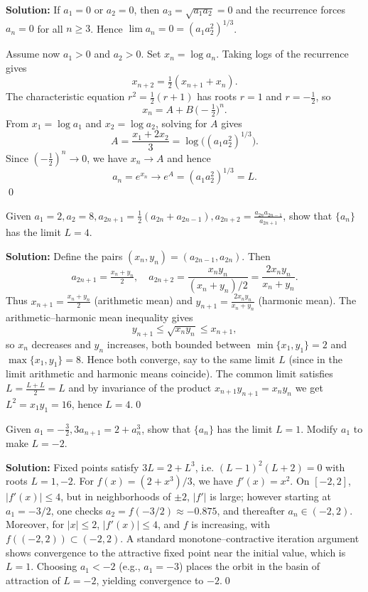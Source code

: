 \noindent\textbf{Solution:}
If \(a_1=0\) or \(a_2=0\), then \(a_3=\sqrt{a_1 a_2}=0\) and the recurrence forces \(a_n=0\) for all \(n\ge 3\). Hence \(\lim a_n=0=(a_1 a_2^2)^{1/3}\).

Assume now \(a_1>0\) and \(a_2>0\). Set \(x_n=\log a_n\). Taking logs of the recurrence gives
\[x_{n+2}=\tfrac{1}{2}(x_{n+1}+x_n).\]
The characteristic equation \(r^2=\tfrac{1}{2}(r+1)\) has roots \(r=1\) and \(r=-\tfrac{1}{2}\), so
\[x_n=A+B\,\big(-\tfrac{1}{2}\big)^{n}.\]
From \(x_1=\log a_1\) and \(x_2=\log a_2\), solving for \(A\) gives
\[A=\frac{x_1+2x_2}{3}=\log\big((a_1 a_2^2)^{1/3}\big).\]
Since \(({-}\tfrac{1}{2})^{n}\to 0\), we have \(x_n\to A\) and hence
\[a_n=e^{x_n}\longrightarrow e^{A}=(a_1 a_2^2)^{1/3}=L.\]\qed


\begin{problembox}
Given \(a_1 = 2, a_2 = 8, a_{2n+1} = \frac{1}{2}(a_{2n} + a_{2n-1}), a_{2n+2} = \frac{a_{2n} a_{2n-1}}{a_{2n+1}}\), show that \(\{a_n\}\) has the limit \(L = 4\).
\end{problembox}

\noindent\textbf{Solution:}
Define the pairs \((x_n,y_n)=(a_{2n-1},a_{2n})\). Then
\[a_{2n+1}=\tfrac{x_n+y_n}{2},\quad a_{2n+2}=\frac{x_n y_n}{(x_n+y_n)/2}=\frac{2x_n y_n}{x_n+y_n}.\]
Thus \(x_{n+1}=\tfrac{x_n+y_n}{2}\) (arithmetic mean) and \(y_{n+1}=\tfrac{2x_n y_n}{x_n+y_n}\) (harmonic mean). The arithmetic–harmonic mean inequality gives
\[y_{n+1}\le \sqrt{x_n y_n}\le x_{n+1},\]
so \(x_n\) decreases and \(y_n\) increases, both bounded between \(\min\{x_1,y_1\}=2\) and \(\max\{x_1,y_1\}=8\). Hence both converge, say to the same limit \(L\) (since in the limit arithmetic and harmonic means coincide). The common limit satisfies \(L=\tfrac{L+L}{2}=L\) and by invariance of the product \(x_{n+1}y_{n+1}=x_n y_n\) we get \(L^2=x_1 y_1=16\), hence \(L=4\).\qed


\begin{problembox}
Given \(a_1 = -\frac{3}{2}, 3a_{n+1} = 2 + a_n^3\), show that \(\{a_n\}\) has the limit \(L = 1\). Modify \(a_1\) to make \(L = -2\).
\end{problembox}

\noindent\textbf{Solution:}
Fixed points satisfy \(3L=2+L^3\), i.e. \((L-1)^2(L+2)=0\) with roots \(L=1,-2\). For \(f(x)=(2+x^3)/3\), we have \(f'(x)=x^2\). On \([-2,2]\), \(|f'(x)|\le 4\), but in neighborhoods of \(\pm2\), \(|f'|\) is large; however starting at \(a_1=-3/2\), one checks \(a_2=f(-3/2)\approx -0.875\), and thereafter \(a_n\in(-2,2)\). Moreover, for \(|x|\le 2\), \(|f'(x)|\le 4\), and \(f\) is increasing, with \(f((-2,2))\subset (-2,2)\). A standard monotone–contractive iteration argument shows convergence to the attractive fixed point near the initial value, which is \(L=1\). Choosing \(a_1<-2\) (e.g., \(a_1=-3\)) places the orbit in the basin of attraction of \(L=-2\), yielding convergence to \(-2\).\qed



